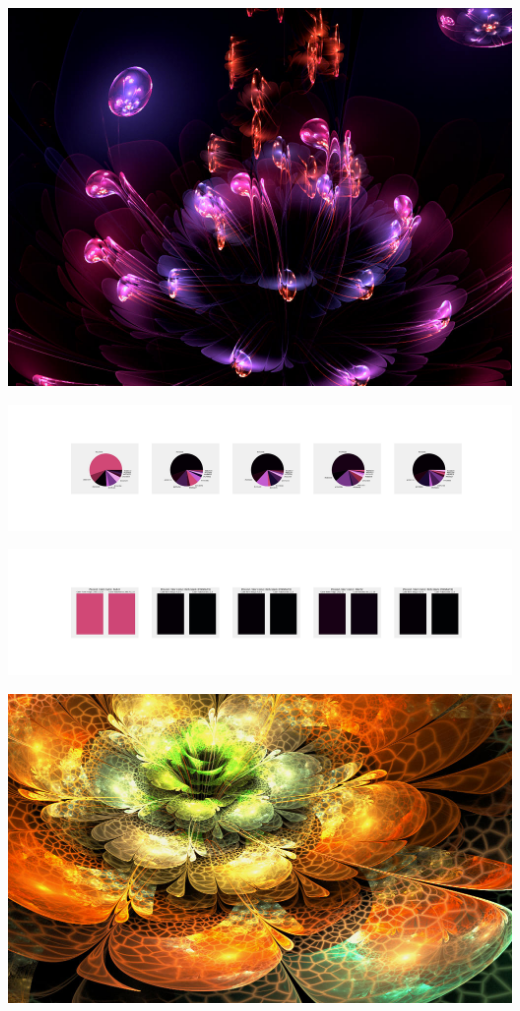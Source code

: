\documentclass[11pt]{article}
\begin{document}
\begin{landscape}
    \begin{center}
    \includegraphics[width=\textwidth]{./nbimg/file (47).jpg}
    \end{center}

    \begin{center}
    \includegraphics[width=250mm]{./nbimg/pie-393.jpg}
    \end{center}

    \begin{center}
    \includegraphics[width=250mm]{./nbimg/peak-393.jpg}
    \end{center}
    

    \begin{center}
    \includegraphics[width=\textwidth]{./nbimg/file (48).jpg}
    \end{center}


\end{landscape}
\end{document}
